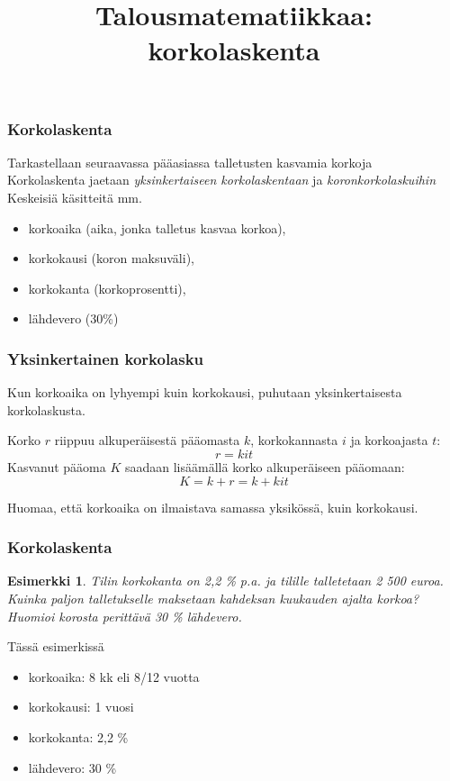 \documentclass[]{beamer}\usepackage[]{graphicx}\usepackage[]{color}
\title{Talousmatematiikkaa: korkolaskenta}
\newtheorem{esim}{Esimerkki}
\newcommand{\pblock}{\\ \vspace{0.5cm}\pause}
\begin{document}
\begin{frame}
\maketitle
\end{frame}
\begin{frame}
    \frametitle{Korkolaskenta}
    Tarkastellaan seuraavassa pääasiassa talletusten kasvamia korkoja
    \pblock
    Korkolaskenta jaetaan \emph{yksinkertaiseen korkolaskentaan} ja \emph{koronkorkolaskuihin}
    \pblock
    Keskeisiä käsitteitä mm.
    \begin{itemize}
        \item korkoaika (aika, jonka talletus kasvaa korkoa),
        \item korkokausi (koron maksuväli),
        \item korkokanta (korkoprosentti),
        \item lähdevero (30\%)
    \end{itemize}
\end{frame}

\begin{frame}
    \frametitle{Yksinkertainen korkolasku}
    Kun korkoaika on lyhyempi kuin korkokausi, puhutaan yksinkertaisesta korkolaskusta.
    \pause
    \begin{block}{}
        Korko \(r\) riippuu alkuperäisestä pääomasta \(k\), korkokannasta \(i\) ja korkoajasta \(t\):\pause
        \[
        r = kit
        \]\pause
        Kasvanut pääoma \(K\) saadaan lisäämällä korko alkuperäiseen pääomaan:\pause
        \[
        K = k + r = k + kit
        \]
    \end{block}
    Huomaa, että korkoaika on ilmaistava samassa yksikössä, kuin korkokausi.
\end{frame}

\begin{frame}
    \frametitle{Korkolaskenta}
    \begin{esim}
        Tilin korkokanta on 2,2 \% p.a. ja tilille talletetaan 2 500 euroa.
        Kuinka paljon talletukselle maksetaan kahdeksan kuukauden ajalta korkoa? Huomioi korosta perittävä 30 \% lähdevero.
    \end{esim}
    \pause
    Tässä esimerkissä
    \begin{itemize}
        \item korkoaika: 8 kk eli 8/12 vuotta
        \item korkokausi: 1 vuosi
        \item korkokanta: 2,2 \%
        \item lähdevero: 30 \%
    \end{itemize}
\end{frame}
\end{document}
